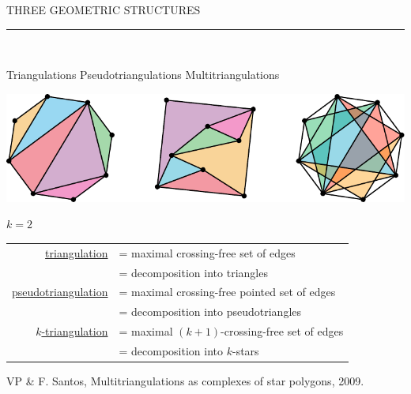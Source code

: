 \documentclass[12pt,titlepage,landscape,a4paper]{article}
\newcommand{\textemoyen}{\fontsize{23}{27}\selectfont}
\newenvironment{slide}[1]
{
\newpage
\begin{center}
{\blue \textemoyen \uppercase{#1}}\\
\end{center}
\vspace{-1cm}
\rule{\textwidth}{0.5 pt}\\
\vspace{-.8cm}
}
{\vspace*{-3cm}}
\newcommand{\violet}{\color{violet}} %
\newcommand{\blue}{\color{blue}} %
\newcommand{\papier}[1]{{\violet\fontsize{15}{20}\selectfont #1}} %
\renewcommand{\emph}[1]{\uline{#1}}
\begin{document}
\begin{slide}{Three geometric structures}

\hspace{1.6cm} Triangulations \hspace{3.4cm} Pseudotriangulations \hspace{2.5cm} Multitriangulations\\
\begin{center}\includegraphics[scale=1.9]{geometricStructures2}\end{center}
\vspace{-1.08cm} \hspace*{25.7cm} ${k=2}$

\bigskip
\begin{center}
\begin{tabular}{rl}
\emph{triangulation} & = maximal crossing-free set of edges \\
\vspace{.3cm}
& = decomposition into triangles \\

\emph{pseudotriangulation} & = maximal crossing-free pointed set of edges \\
\vspace{.3cm}
& = decomposition into pseudotriangles \\

\emph{$k$-triangulation} & = maximal $(k+1)$-crossing-free set of edges \\
& = decomposition into $k$-stars
\end{tabular}
\end{center}

\vspace{.2cm}
\papier{VP \& F. Santos, Multitriangulations as complexes of star polygons, 2009.}

\vspace{-1cm}
\end{slide}
\end{document}
